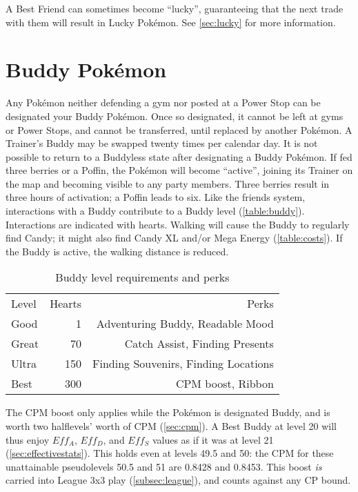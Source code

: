 A Best Friend can sometimes become ``lucky'', guaranteeing that the next trade with
  them will result in Lucky Pokémon.
See \autoref{sec:lucky} for more information.

\section{Buddy Pokémon}
\label{sec:buddies}
Any Pokémon neither defending a gym nor posted at a Power Stop can be designated your Buddy Pokémon.
Once so designated, it cannot be left at gyms or Power Stops, and cannot be transferred,
  until replaced by another Pokémon.
A Trainer's Buddy may be swapped twenty times per calendar day.
It is not possible to return to a Buddyless state after designating a Buddy Pokémon.
If fed three berries or a Poffin, the Pokémon will become ``active'',
  joining its Trainer on the map and becoming visible to any party members.
Three berries result in three hours of activation; a Poffin leads to six.
Like the friends system, interactions with a Buddy contribute to a Buddy level (\autoref{table:buddy}).
Interactions are indicated with hearts.
Walking will cause the Buddy to regularly find Candy; it might also find Candy XL
  and/or Mega Energy (\autoref{table:costs}).
If the Buddy is active, the walking distance is reduced.
\begin{table}
\centering
\begin{tabular}{lrr}
Level & Hearts & Perks\\
\Midrule
Good & 1 & Adventuring Buddy, Readable Mood\\
Great & 70 & Catch Assist, Finding Presents\\
Ultra & 150 & Finding Souvenirs, Finding Locations\\
Best & 300 & CPM boost, Ribbon\\
\end{tabular}
\caption{Buddy level requirements and perks}
\label{table:buddy}
\end{table}
The CPM boost only applies while the Pokémon is designated Buddy,
  and is worth two halflevels' worth of CPM (\autoref{sec:cpm}).
A Best Buddy at level 20 will thus enjoy $Eff_A$, $Eff_D$, and $Eff_S$ values
  as if it was at level 21 (\autoref{sec:effectivestats}).
This holds even at levels 49.5 and 50: the CPM for these unattainable
  pseudolevels 50.5 and 51 are 0.8428 and 0.8453.
This boost \textit{is} carried into League 3x3 play (\autoref{subsec:league}),
  and counts against any CP bound.
